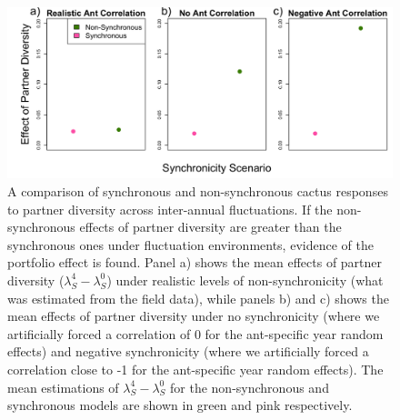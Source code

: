 \documentclass[11pt]{article}
\begin{document}
\begin{figure}
	\includegraphics[width=0.91\linewidth]{Figures/cor0_Portfolio_Effect.png}
	\caption{
	A comparison of synchronous and non-synchronous cactus responses to partner diversity across inter-annual fluctuations. 
	If the non-synchronous effects of partner diversity are greater than the synchronous ones under fluctuation environments, evidence of the portfolio effect is found.
	Panel a) shows the mean effects of partner diversity ($\lambda_{S}^4-\lambda_{S}^0$) under realistic levels of non-synchronicity (what was estimated from the field data), while panels b) and c) shows the mean effects of partner diversity under no synchronicity (where we artificially forced a correlation of 0 for the ant-specific year random effects) and negative synchronicity (where we artificially forced a correlation close to -1 for the ant-specific year random effects).
	The mean estimations of $\lambda_{S}^4-\lambda_{S}^0$ for the non-synchronous and synchronous models are shown in green and pink respectively. 
	}
	\label{app:portfolio}
\end{figure}
\end{document}
